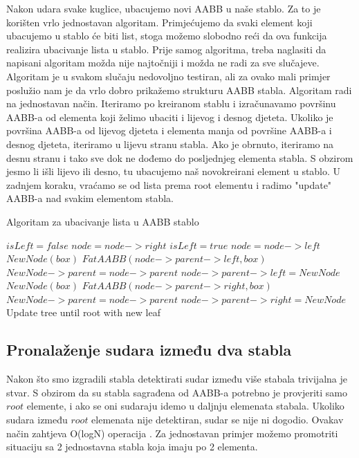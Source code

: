 Nakon udara svake kuglice, ubacujemo novi AABB u naše stablo. Za to je korišten vrlo jednostavan algoritam. Primjećujemo da svaki element koji ubacujemo u stablo će biti list, stoga možemo slobodno reći da ova funkcija realizira ubacivanje lista u stablo\cite{6}. Prije samog algoritma, treba naglasiti da napisani algoritam možda nije najtočniji i možda ne radi za sve slučajeve. Algoritam je u svakom slučaju nedovoljno testiran, ali za ovako mali primjer poslužio nam je da vrlo dobro prikažemo strukturu AABB stabla. Algoritam radi na jednostavan način. Iteriramo po kreiranom stablu i izračunavamo površinu AABB-a od elementa koji želimo ubaciti i lijevog i desnog djeteta. Ukoliko je površina AABB-a od lijevog djeteta i elementa manja od površine AABB-a i desnog djeteta, iteriramo u lijevu stranu stabla. Ako je obrnuto, iteriramo na desnu stranu i tako sve dok ne dođemo do posljednjeg elementa stabla\cite{6}. S obzirom jesmo li išli lijevo ili desno, tu ubacujemo naš novokreirani element u stablo. U zadnjem koraku, vraćamo se od lista prema root elementu i radimo "update" AABB-a nad svakim elementom stabla.\newpage
\begin{algorithm}
	\caption{Algoritam za ubacivanje lista u AABB stablo}
	\label{alg:leaf_insertion}
	\begin{algorithmic}
		 \State $isLeft = false$
		\State $node = node->right$
		\Else
		\State $isLeft = true$
		\State $node = node->left$
		\EndIf
		\EndWhile
		\State $NewNode(box)$
		\State $FatAABB(node->parent->left, box)$
		\State $NewNode->parent = node->parent$
		\State $node->parent->left = NewNode$
		\Else
		\State $NewNode(box)$
		\State $FatAABB(node->parent->right, box)$
		\State $NewNode->parent = node->parent$
		\State $node->parent->right = NewNode$
		\EndIf
		\State Update tree until root with new leaf
		\EndFunction
	\end{algorithmic}
\end{algorithm}\newpage

\subsection{Pronalaženje sudara između dva stabla}
Nakon što smo izgradili stabla detektirati sudar između više stabala trivijalna je stvar. S obzirom da su stabla sagrađena od AABB-a potrebno je provjeriti samo $root$ elemente, i ako se oni sudaraju idemo u daljnju elemenata stabala. Ukoliko sudara između $root$ elemenata nije detektiran, sudar se nije ni dogodio. Ovakav način zahtjeva O(logN) operacija \cite{1}. Za jednostavan primjer možemo promotriti situaciju sa 2 jednostavna stabla koja imaju po 2 elementa. 

